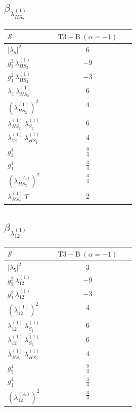 \documentclass[9pt]{article}
\begin{document}
\subsection*{$ \beta_{\lambda_{HS_2}^{(1)}} $}
\begin{longtable}{@{}p{0.31\linewidth}c@{}}
\toprule
$\mathcal{S}$ & $ \mathrm{T3-B}\;(\alpha=-1) $ \\
\midrule
$ |\lambda_5|^2 $ & $ 6 $ \\
$ g_2^2\,\lambda_{HS_2}^{(1)} $ & $ -9 $ \\
$ g_1^2\,\lambda_{HS_2}^{(1)} $ & $ -3 $ \\
$ \lambda_1\,\lambda_{HS_2}^{(1)} $ & $ 6 $ \\
$ \left(\lambda_{HS_2}^{(1)}\right)^2 $ & $ 4 $ \\
$ \lambda_{HS_2}^{(1)}\,\lambda_{S_2}^{(1)} $ & $ 6 $ \\
$ \lambda_{12}^{(1)}\,\lambda_{HS_1}^{(1)} $ & $ 4 $ \\
$ g_2^4 $ & $ \frac{9}{4} $ \\
$ g_1^4 $ & $ \frac{3}{4} $ \\
$ \left(\lambda_{HS_2}^{(A)}\right)^2 $ & $ \frac{3}{4} $ \\
$ \lambda_{HS_2}^{(1)}\,T $ & $ 2 $ \\
\bottomrule
\end{longtable}
\subsection*{$ \beta_{\lambda_{12}^{(1)}} $}
\begin{longtable}{@{}p{0.31\linewidth}c@{}}
\toprule
$\mathcal{S}$ & $ \mathrm{T3-B}\;(\alpha=-1) $ \\
\midrule
$ |\lambda_5|^2 $ & $ 3 $ \\
$ g_2^2\,\lambda_{12}^{(1)} $ & $ -9 $ \\
$ g_1^2\,\lambda_{12}^{(1)} $ & $ -3 $ \\
$ \left(\lambda_{12}^{(1)}\right)^2 $ & $ 4 $ \\
$ \lambda_{12}^{(1)}\,\lambda_{S_1}^{(1)} $ & $ 6 $ \\
$ \lambda_{12}^{(1)}\,\lambda_{S_2}^{(1)} $ & $ 6 $ \\
$ \lambda_{HS_1}^{(1)}\,\lambda_{HS_2}^{(1)} $ & $ 4 $ \\
$ g_2^4 $ & $ \frac{9}{4} $ \\
$ g_1^4 $ & $ \frac{3}{4} $ \\
$ \left(\lambda_{12}^{(A)}\right)^2 $ & $ \frac{3}{4} $ \\
\bottomrule
\end{longtable}
\end{document}
